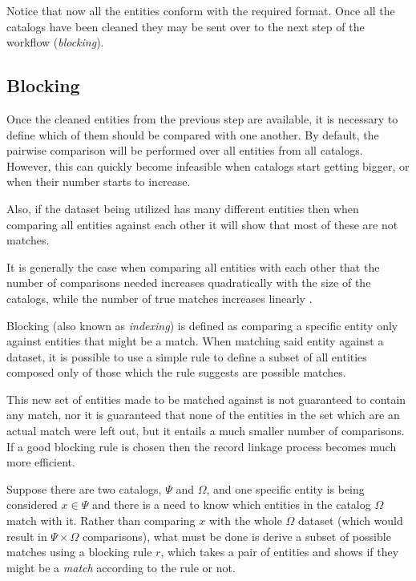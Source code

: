 \documentclass[epsfig,a4paper,11pt,titlepage,twoside,openany]{book}
\begin{document}
Notice that now all the entities conform with the required format. Once all the
catalogs have been cleaned they may be sent over to the next step of the workflow
(\textit{blocking}).



\subsection{Blocking}
\label{sec:rl-workflow-blocking}


Once the cleaned entities from the previous step are available, it is necessary to define which
of them should be compared with one another. By default, the pairwise comparison will be performed over all entities from all catalogs. However, this can quickly
become infeasible when catalogs start getting bigger, or when their number starts to increase. 

Also, if the dataset being utilized has many different
entities then when comparing all entities against each other it will show that most of these are not matches.


It is generally the case when comparing all entities with each other that
the number of comparisons needed increases quadratically with the size of the
catalogs, while the number of true matches increases linearly
\cite{christen12_data}.

Blocking (also known as \textit{indexing}) is defined as comparing a specific entity only against entities that might be a match. When matching said entity against a dataset, it is possible to use a simple rule to define a subset of all entities
composed only of those which the rule suggests are possible matches. 

This new set of entities made to be matched against is not guaranteed to contain any match, nor it
is guaranteed that none of the entities in the set which are an actual match were left out, but it entails a much smaller number of comparisons. 
If a good blocking rule is chosen then the record linkage process becomes much more efficient.

Suppose there are two catalogs, $\Psi$ and $\Omega$, and one specific entity is being considered $x \in
\Psi$ and there is a need to know which entities in the catalog $\Omega$ match with it.
Rather than comparing $x$ with the whole $\Omega$ dataset (which would result in
$\Psi \times \Omega$ comparisons), what must be done is derive a subset of possible matches using a
blocking rule $r$, which takes a pair of entities and shows if they might be a \textit{match} according to the rule or not.
\end{document}
